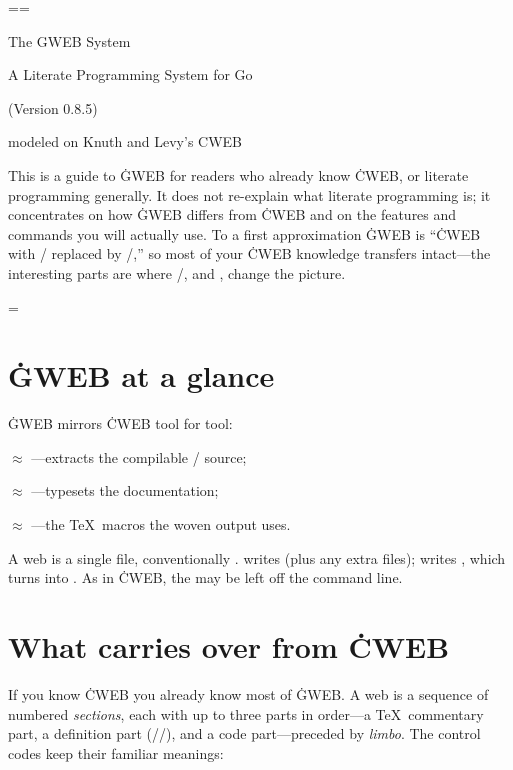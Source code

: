 \headline={\hfil}\footline={\hfil}
\null\vfill
\centerline{\titlefont The {\ttitlefont GWEB} System}
\vskip 6pt
\centerline{\sectionfont A Literate Programming System for Go}
\vskip 18pt
\centerline{(Version 0.8.5)}
\vskip 24pt
\centerline{\authorfont modeled on Knuth and Levy's {\ttitlefont CWEB}}
\vfill
\noindent
This is a guide to \.{GWEB} for readers who already know \.{CWEB}, or
literate programming generally. It does not re-explain what literate programming
is; it concentrates on how \.{GWEB} differs from \.{CWEB} and on the features and
commands you will actually use. To a first approximation \.{GWEB} is ``\.{CWEB} with \CEE/
replaced by \GO/,'' so most of your \.{CWEB} knowledge transfers intact---the
interesting parts are where \GO/, and , change the picture.
\vfil\eject

\headline={\ifodd\pageno\rheader\else\lheader\fi}

\chapter{\.{GWEB} at a glance}
\noindent\.{GWEB} mirrors \.{CWEB} tool for tool:

\bull {} $\approx$ ---extracts the compilable \GO/ source;

\bull {} $\approx$ ---typesets the documentation;

\bull {} $\approx$ ---the \TeX\ macros the woven
output uses.

\noindent A web is a single file, conventionally . 
writes  (plus any extra files);  writes ,
which  turns into . As in \.{CWEB}, the  may be left
off the command line.

\chapter{What carries over from \.{CWEB}}
\noindent
If you know \.{CWEB} you already know most of \.{GWEB}. A web is a sequence of numbered
{\it sections}, each with up to three parts in order---a \TeX\ commentary
part, a definition part (//), and a code part---preceded
by {\it limbo}. The control codes keep their familiar meanings:

